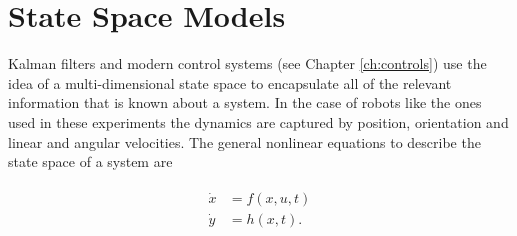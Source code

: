 

\section{State Space Models}
\label{sec:statespacemodels}
Kalman filters and modern control systems (see Chapter \ref{ch:controls}) use the idea of a multi-dimensional state space to encapsulate all of the relevant information that is known about a system. In the case of robots like the ones used in these experiments the dynamics are captured by position, orientation and linear and angular velocities. The general nonlinear equations to describe the state space of a system are

\begin{align}
\label{eq:statespace}
\begin{split}
\dot{x} &= f(x,u,t) \\
\dot{y} &= h(x,t).
\end{split}
\end{align}

